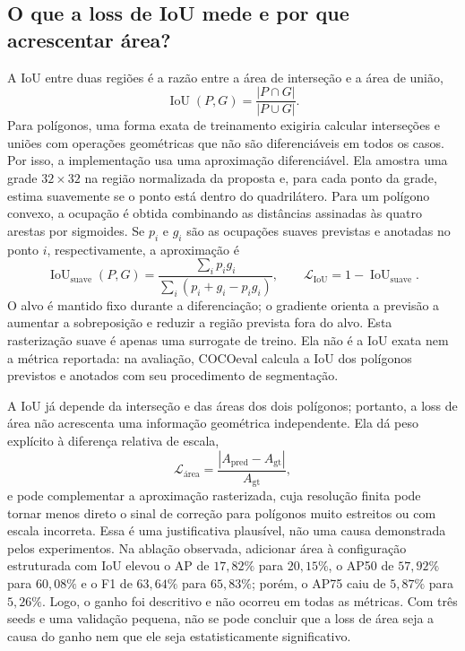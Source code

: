 \documentclass[11pt]{article}
\begin{document}
\subsection{O que a loss de IoU mede e por que acrescentar área?}

A IoU entre duas regiões é a razão entre a área de interseção e a área de união,
\[
\operatorname{IoU}(P,G)=\frac{|P\cap G|}{|P\cup G|}.
\]
Para polígonos, uma forma exata de treinamento exigiria calcular interseções e
uniões com operações geométricas que não são diferenciáveis em todos os casos.
Por isso, a implementação usa uma aproximação diferenciável. Ela amostra uma
grade $32\times32$ na região normalizada da proposta e, para cada ponto da grade,
estima suavemente se o ponto está dentro do quadrilátero. Para um polígono convexo,
a ocupação é obtida combinando as distâncias assinadas às quatro arestas por
sigmoides. Se $p_i$ e $g_i$ são as ocupações suaves previstas e anotadas no ponto
$i$, respectivamente, a aproximação é
\[
\operatorname{IoU}_{\mathrm{suave}}(P,G)=
\frac{\sum_i p_i g_i}{\sum_i (p_i+g_i-p_i g_i)},\qquad
\mathcal{L}_{\mathrm{IoU}}=1-\operatorname{IoU}_{\mathrm{suave}}.
\]
O alvo é mantido fixo durante a diferenciação; o gradiente orienta a previsão a
aumentar a sobreposição e reduzir a região prevista fora do alvo. Esta rasterização
suave é apenas uma surrogate de treino. Ela não é a IoU exata nem a métrica
reportada: na avaliação, COCOeval calcula a IoU dos polígonos previstos e anotados
com seu procedimento de segmentação.

A IoU já depende da interseção e das áreas dos dois polígonos; portanto, a loss de
área não acrescenta uma informação geométrica independente. Ela dá peso explícito
à diferença relativa de escala,
\[
\mathcal{L}_{\mathrm{área}}=
\frac{|A_{\mathrm{pred}}-A_{\mathrm{gt}}|}{A_{\mathrm{gt}}},
\]
e pode complementar a aproximação rasterizada, cuja resolução finita pode tornar
menos direto o sinal de correção para polígonos muito estreitos ou com escala
incorreta. Essa é uma justificativa plausível, não uma causa demonstrada pelos
experimentos. Na ablação observada, adicionar área à configuração estruturada com
IoU elevou o AP de $17,82\%$ para $20,15\%$, o AP50 de $57,92\%$ para $60,08\%$ e
o F1 de $63,64\%$ para $65,83\%$; porém, o AP75 caiu de $5,87\%$ para $5,26\%$.
Logo, o ganho foi descritivo e não ocorreu em todas as métricas. Com três seeds e
uma validação pequena, não se pode concluir que a loss de área seja a causa do
ganho nem que ele seja estatisticamente significativo.
\end{document}
